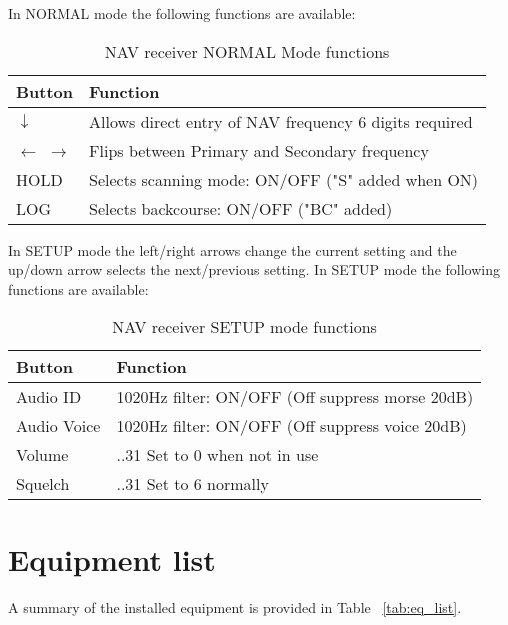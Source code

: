 In NORMAL mode the following functions are available:
\begin{table}[H]
\caption{NAV receiver NORMAL Mode functions}
\label{tab:nav_normal}
\begin{tabularx}{\linewidth}{
    |>{\hsize=0.2\hsize}X| 
     >{\hsize=0.8\hsize}X| 
     } 
\hline
Button &Function \\
\hline
$\downarrow$ &Allows direct entry of NAV frequency 6 digits required\\
\hline
$\leftarrow$ $\rightarrow$ &Flips between Primary and Secondary frequency \\
\hline
HOLD &Selects scanning mode: ON/OFF ("S" added when ON)\\
\hline
LOG &Selects backcourse: ON/OFF ("BC" added)\\
\hline
\end{tabularx}
\end{table}

In SETUP mode the left/right arrows change the current setting and the up/down arrow selects the next/previous setting.  In SETUP mode the following functions are available:
\begin{table}[H]
\caption{NAV receiver SETUP mode functions}
\label{tab:nav_setup}
\begin{tabularx}{\linewidth}{
    |>{\hsize=0.2\hsize}X| 
     >{\hsize=0.8\hsize}X| 
     } 
\hline
Button &Function \\
\hline
 Audio ID &1020Hz filter: ON/OFF (Off suppress morse 20dB)\\
\hline
 Audio Voice &1020Hz filter: ON/OFF (Off suppress voice 20dB)\\
\hline
 Volume &0..31 Set to 0 when not in use\\
\hline
 Squelch &0..31 Set to 6 normally\\
\hline
\end{tabularx}
\end{table}

\section{Equipment list}
A summary of the installed equipment is provided in Table ~\ref{tab:eq_list}.  

